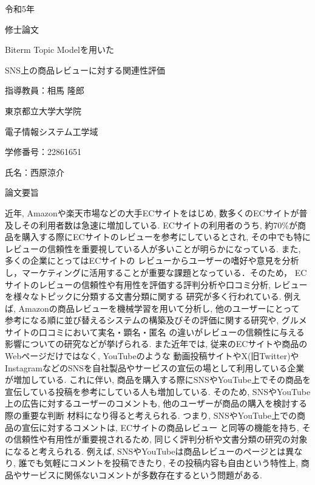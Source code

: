 \documentclass{ltjarticle}
\begin{document}
\begin{titlepage}
    \begin{center}
        {\Large 令和5年}
        \vspace{10truept}

        {\Large 修士論文}
        \vspace*{180truept}

        {\Huge Biterm Topic Modelを用いた}\par
        {\Huge SNS上の商品レビューに対する関連性評価}
        \vspace{160truept}

        {\Large 指導教員：相馬 隆郎}
        \vspace{30truept}

        {\Large 東京都立大学大学院}
        \vspace{10truept}

        {\Large 電子情報システム工学域}
        \vspace{30truept}

        {\Large 学修番号：22861651}
        \vspace{10truept}
        
        {\Large 氏名：西原涼介}
    \end{center}
\end{titlepage}
\noindent
{\LARGE 論文要旨}
\vspace{20truept}

近年, Amazonや楽天市場などの大手ECサイトをはじめ, 数多くのECサイトが普及しその利用者数は急速に増加している. 
ECサイトの利用者のうち, 約70\%が商品を購入する際にECサイトのレビューを参考にしているとされ, 
その中でも特にレビューの信頼性を重要視している人が多いことが明らかになっている. また, 多くの企業にとってはECサイトの
レビューからユーザーの嗜好や意見を分析し，マーケティングに活用することが重要な課題となっている．そのため，
ECサイトのレビューの信頼性や有用性を評価する評判分析や口コミ分析, レビューを様々なトピックに分類する文書分類に関する
研究が多く行われている. 例えば, Amazonの商品レビューを機械学習を用いて分析し, 他のユーザーにとって
参考になる順に並び替えるシステムの構築及びその評価に関する研究や, グルメサイトの口コミにおいて実名・顕名・匿名
の違いがレビューの信頼性に与える影響についての研究などが挙げられる. 
また近年では, 従来のECサイトや商品のWebページだけではなく, YouTubeのような
動画投稿サイトやX(旧Twitter)やInstagramなどのSNSを自社製品やサービスの宣伝の場として利用している企業が増加している. 
これに伴い, 商品を購入する際にSNSやYouTube上でその商品を宣伝している投稿を参考にしている人も増加している. 
そのため, SNSやYouTube上の広告に対するユーザーのコメントも, 他のユーザーが商品の購入を検討する際の重要な判断
材料になり得ると考えられる. つまり, SNSやYouTube上での商品の宣伝に対するコメントは, ECサイトの商品レビュー
と同等の機能を持ち, その信頼性や有用性が重要視されるため, 同じく評判分析や文書分類の研究の対象になると考えられる. 
例えば, SNSやYouTubeは商品レビューのページとは異なり, 誰でも気軽にコメントを投稿できたり, その投稿内容も自由という特性上, 
商品やサービスに関係ないコメントが多数存在するという問題がある.
\end{document}
